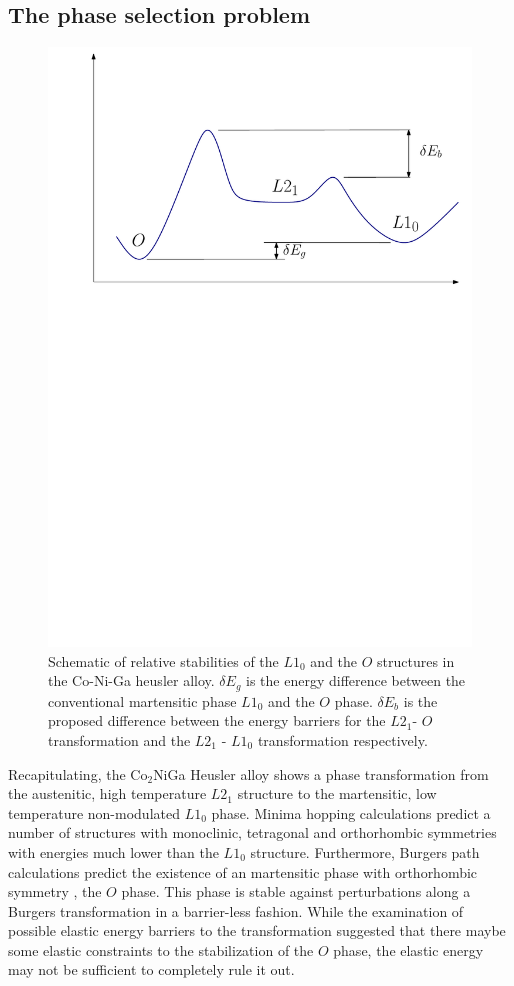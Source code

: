 \documentclass[%
preprint,
 amsmath,amssymb,
 aps,
prb,
showkeys,
]{revtex4-1}
\begin{document}
\subsection{The phase selection problem}
 \begin{figure}[htp!]
  \includegraphics[scale=0.7]{figure_5}
  \caption{Schematic of relative stabilities of  the $L1_0$ and the $O$ structures in the Co-Ni-Ga heusler alloy. $\delta E_g$ is the energy difference between the conventional martensitic phase $L1_0$ and the $O$ phase. $\delta E_b$ is the proposed difference between the energy barriers for the $L2_1$- $ O$ transformation and the  $L2_1$ - $L1_0$ transformation respectively.}
  \label{phase_selection}
\end{figure}
Recapitulating, the Co$_2$NiGa Heusler alloy shows a phase transformation from the austenitic, high temperature $L2_1$ structure to the martensitic, low temperature non-modulated $L1_0$ phase.  Minima hopping calculations predict a number of structures with monoclinic, tetragonal and orthorhombic symmetries with energies much lower than the $L1_0$ structure. Furthermore, Burgers path calculations  predict the existence of an martensitic phase with orthorhombic symmetry , the $ O $ phase. This phase is stable against perturbations along a Burgers transformation in a barrier-less fashion. While the examination of possible elastic energy barriers to the transformation suggested that there maybe some elastic constraints to the stabilization of the $O$ phase, the elastic energy may not be sufficient to completely rule it out.  
\end{document}
